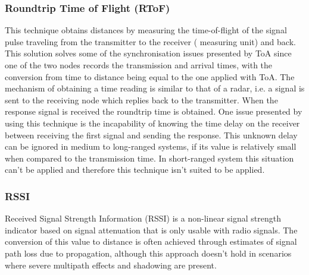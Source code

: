  
 
 
\subsubsection{Roundtrip Time of Flight (RToF)} 
\label{subsubsec:rtfo} 
 
 
This technique obtains distances by measuring the time-of-flight of the signal pulse traveling from the transmitter to the receiver ( measuring unit) and back\cite{rtfo}. This solution solves some of the synchronisation issues presented by \ac{ToA} since one of the two nodes records the transmission and arrival times, with the conversion from time to distance being equal to the one applied with \ac{ToA}. The mechanism of obtaining a time reading is similar to that of a radar, i.e. a signal is sent to the receiving node which replies back to the transmitter. When the response signal is received the roundtrip time is obtained. One issue presented by using this technique is the incapability of knowing the time delay on the receiver between receiving the first signal and sending the response. This unknown delay can be ignored in medium to long-ranged systems, if its value is relatively small when compared to the transmission time. In short-ranged system this situation can't be applied and therefore this technique isn't suited to be applied. 
 
 
 
 
\subsubsection{ \ac{RSSI}} 
\label{subsubsec:rssi} 
 
 
Received Signal Strength Information (RSSI) is a non-linear signal strength indicator based on signal attenuation that is only usable with radio signals. The conversion of this value to distance is often achieved through estimates of signal path loss due to propagation, although this approach doesn't hold in scenarios where severe multipath effects and shadowing are present. 
 
